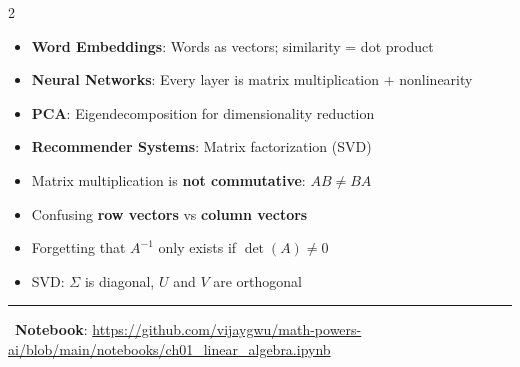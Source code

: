 \documentclass[11pt,letterpaper]{article}
\begin{document}
\begin{multicols}{2}
\begin{center}
\end{center}

\begin{tcolorbox}[appbox, title={\faRobot\ ML Applications}]
\begin{itemize}
    \item \textbf{Word Embeddings}: Words as vectors; similarity = dot product
    \item \textbf{Neural Networks}: Every layer is matrix multiplication + nonlinearity
    \item \textbf{PCA}: Eigendecomposition for dimensionality reduction
    \item \textbf{Recommender Systems}: Matrix factorization (SVD)
\end{itemize}
\end{tcolorbox}

\begin{tcolorbox}[warningbox, title={\faExclamationTriangle\ Common Pitfalls}]
\begin{itemize}
    \item Matrix multiplication is \textbf{not commutative}: $AB \neq BA$
    \item Confusing \textbf{row vectors} vs \textbf{column vectors}
    \item Forgetting that $A^{-1}$ only exists if $\det(A) \neq 0$
    \item SVD: $\Sigma$ is diagonal, $U$ and $V$ are orthogonal
\end{itemize}
\end{tcolorbox}

\end{multicols}

\vspace{5pt}
\hrule
\vspace{5pt}

\begin{center}
\faGithub\ \textbf{Notebook}: \url{https://github.com/vijaygwu/math-powers-ai/blob/main/notebooks/ch01_linear_algebra.ipynb}
\end{center}
\end{document}
